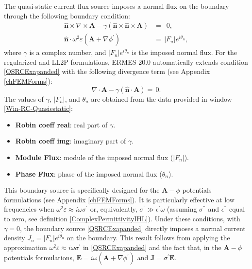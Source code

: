 The quasi-static current flux source imposes a normal flux on the boundary through the following boundary condition: 
\begin{equation}\label{QSRCExapanded}
	\begin{aligned}
		\mathbf{\hat{n}}\times\nabla\times\mathbf{A} - \gamma(\mathbf{\hat{n}}\times\mathbf{\hat{n}}\times\mathbf{A}) &= \,\,\,0,
		\\
		\mathbf{\hat{n}}\cdot\omega^{2}\varepsilon\left(\mathbf{A} + \nabla\phi^{'}\right) &= \,|F_{n}|e^{i\theta_{n}},
	\end{aligned}
\end{equation}
where $\gamma$ is a complex number, and $|F_{n}|e^{i\theta_{n}}$ is the imposed normal flux. For the regularized and LL2P formulations, ERMES 20.0 automatically extends condition \eqref{QSRCExapanded} with the following divergence term (see Appendix \ref{chFEMForms}):
\begin{equation}
	\nabla\cdot\mathbf{A} - \gamma\left(\mathbf{\hat{n}}\cdot\mathbf{A}\right) = \,0.	
\end{equation}
The values of $\gamma$, $|F_{n}|$, and $\theta_{n}$ are obtained from the data provided in window \ref{Win-RC-Quasiestatic}:
\begin{itemize}\itemsep0em 
	\item \textbf{Robin coeff real}: real part of $\gamma$. 
	\item \textbf{Robin coeff  img}: imaginary part of $\gamma$. 
	\item \textbf{Module Flux}: module of the imposed normal flux ($|F_{n}|$).
	\item \textbf{Phase Flux}: phase of the imposed normal flux ($\theta_{n}$).
\end{itemize}
This boundary source is specifically designed for the $\textbf{A}-\phi$ potentials formulations (see Appendix \ref{chFEMForms}). It is particularly effective at low frequencies when $\omega^{2}\varepsilon \approx i\omega\sigma^{'}$ or, equivalently, $\sigma^{'} \gg \epsilon^{'}\omega$ (assuming $\sigma^{''}$ and $\epsilon^{''}$ equal to zero, see definition \eqref{ComplexPermittivityIHL}). Under these conditions, with $\gamma = 0$, the boundary source \eqref{QSRCExapanded} directly imposes a normal current density $J_{n} = |F_{n}|e^{i\theta_{n}}$ on the boundary. This result follows from applying the approximation $\omega^{2}\varepsilon \approx i\omega\sigma^{'}$ in \eqref{QSRCExapanded} and the fact that, in the $\textbf{A}-\phi$ potentials formulations, $\mathbf{E} = i\omega(\mathbf{A} + \nabla\phi^{'})$ and $\mathbf{J} = \sigma^{'}\mathbf{E}$. 


